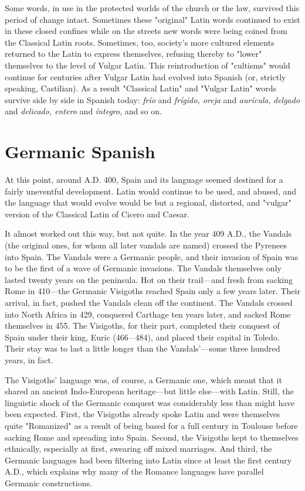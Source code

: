 Some words, in use in the protected worlds of the church or
the law, survived this period of change intact. Sometimes these "original" Latin words continued to exist in these closed confines while
on the streets new words were being coined from the Classical Latin
roots. Sometimes, too, society's more cultured elements returned to
the Latin to express themselves, refusing thereby to "lower" themselves to the level of Vulgar Latin. This reintroduction of "cultisms"
would continue for centuries after Vulgar Latin had evolved into Spanish (or, strictly speaking, Castilian). As a result "Classical Latin" and
"Vulgar Latin" words survive side by side in Spanish today: \emph{frío} and
\emph{frígido, oreja} and \emph{aurícula}, \emph{delgado} and \emph{delicado, entero} and \emph{íntegro}, and so on.

\section{Germanic Spanish}

At this point, around A.D. 400, Spain and its language seemed
destined for a fairly uneventful development. Latin would continue to
be used, and abused, and the language that would evolve would be but
a regional, distorted, and "vulgar" version of the Classical Latin of
Cicero and Caesar.

It almost worked out this way, but not quite. In the year
409 A.D., the Vandals (the original ones, for whom all later vandals are
named) crossed the Pyrenees into Spain. The Vandals were a Germanic
people, and their invasion of Spain was to be the first of a wave of Germanic invasions. The Vandals themselves only lasted twenty years
on the peninsula. Hot on their trail---and fresh from sacking Rome in
410---the Germanic Visigoths reached Spain only a few years later.
Their arrival, in fact, pushed the Vandals clean off the continent. The
Vandals crossed into North Africa in 429, conquered Carthage ten
years later, and sacked Rome themselves in 455. The Visigoths, for
their part, completed their conquest of Spain under their king, Euric
(466\,--\,484), and placed their capital in Toledo. Their stay was to last a
little longer than the Vandals'---some three hundred years, in fact.

The Visigoths' language was, of course, a Germanic one,
which meant that it shared an ancient Indo-European heritage---but
little else---with Latin. Still, the linguistic shock of the Germanic conquest was considerably less than might have been expected. First, the
Visigoths already spoke Latin and were themselves quite "Romanized"
as a result of being based for a full century in Toulouse before sacking
Rome and spreading into Spain. Second, the Visigoths kept to themselves ethnically, especially at first, swearing off mixed marriages. And
third, the Germanic languages had been filtering into Latin since at
least the first century A.D., which explains why many of the Romance
languages have parallel Germanic constructions.

